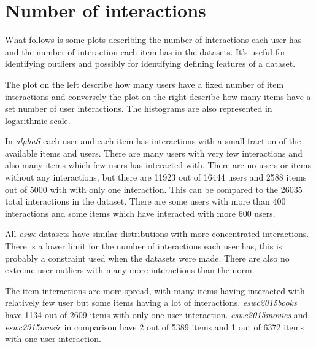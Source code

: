 
\section{Number of interactions}\label{sec:result:interactions}

What follows is some plots describing the number of interactions each user has and the number of interaction each item has in the datasets. It's useful for identifying outliers and possibly for identifying defining features of a dataset.

The plot on the left describe how many users have a fixed number of item interactions and conversely the plot on the right describe how many items have a set number of user interactions. The histograms are also represented in logarithmic scale.

\FloatBarrier


In \textit{alphaS} each user and each item has interactions with a small fraction of the available items and users. There are many users with very few interactions and also many items which few users has interacted with. There are no users or items without any interactions, but there are 11923 out of 16444 users and 2588 items out of 5000 with with only one interaction. This can be compared to the 26035 total interactions in the dataset. There are some users with more than 400 interactions and some items which have interacted with more 600 users.

\newpage




\FloatBarrier

All \textit{eswc} datasets have similar distributions with more concentrated interactions. There is a lower limit for the number of interactions each user has, this is probably a constraint used when the datasets were made.
There are also no extreme user outliers with many more interactions than the norm.

The item interactions are more spread, with many items having interacted with relatively few user but some items having a lot of interactions. \textit{eswc2015books} have 1134 out of 2609 items with only one user interaction. \textit{eswc2015movies} and \textit{eswc2015music} in comparison have 2 out of 5389 items and 1 out of 6372 items with one user interaction.

